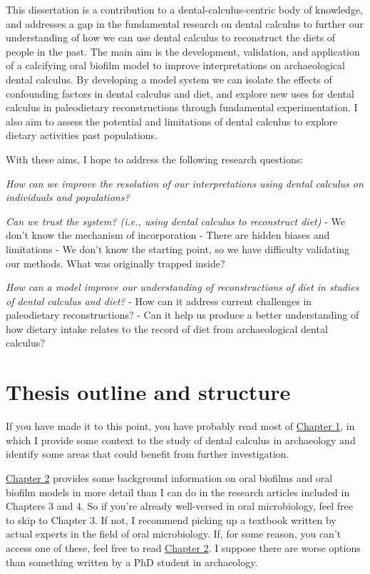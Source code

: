 \documentclass[
  letterpaper,
]{book}
\begin{document}
This dissertation is a contribution to a dental-calculus-centric body of
knowledge, and addresses a gap in the fundamental research on dental
calculus to further our understanding of how we can use dental calculus
to reconstruct the diets of people in the past. The main aim is the
development, validation, and application of a calcifying oral biofilm
model to improve interpretations on archaeological dental calculus. By
developing a model system we can isolate the effects of confounding
factors in dental calculus and diet, and explore new uses for dental
calculus in paleodietary reconstructions through fundamental
experimentation. I also aim to assess the potential and limitations of
dental calculus to explore dietary activities past populations.

With these aims, I hope to address the following research questions:

\emph{How can we improve the resolution of our interpretations using
dental calculus on individuals and populations?}

\emph{Can we trust the system? (i.e., using dental calculus to
reconstruct diet)} - We don't know the mechanism of incorporation -
There are hidden biases and limitations - We don't know the starting
point, so we have difficulty validating our methods. What was originally
trapped inside?

\emph{How can a model improve our understanding of reconstructions of
diet in studies of dental calculus and diet?} - How can it address
current challenges in paleodietary reconstructions? - Can it help us
produce a better understanding of how dietary intake relates to the
record of diet from archaeological dental calculus?

\hypertarget{thesis-outline-and-structure}{%
\section{Thesis outline and
structure}\label{thesis-outline-and-structure}}

If you have made it to this point, you have probably read most of
\protect\hyperlink{chap-intro}{Chapter 1}, in which I provide some
context to the study of dental calculus in archaeology and identify some
areas that could benefit from further investigation.

\protect\hyperlink{chap-background}{Chapter 2} provides some background
information on oral biofilms and oral biofilm models in more detail than
I can do in the research articles included in Chapters 3 and 4. So if
you're already well-versed in oral microbiology, feel free to skip to
Chapter 3. If not, I recommend picking up a textbook written by actual
experts in the field of oral microbiology. If, for some reason, you
can't access one of these, feel free to read
\protect\hyperlink{chap-background}{Chapter 2}. I suppose there are
worse options than something written by a PhD student in archaeology.
\end{document}
